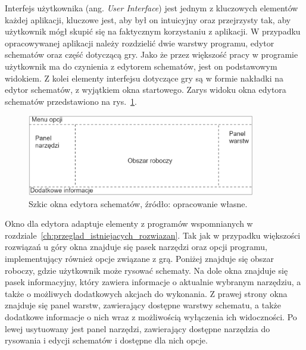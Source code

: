 Interfejs użytkownika (ang. \textit{User Interface}) jest jednym z kluczowych elementów każdej aplikacji,
kluczowe jest, aby był on intuicyjny oraz przejrzysty tak,
aby użytkownik mógł skupić się na faktycznym korzystaniu z aplikacji.
W przypadku opracowywanej aplikacji należy rozdzielić dwie warstwy programu,
edytor schematów oraz część dotyczącą gry.
Jako że przez większość pracy w programie użytkownik ma do czynienia z edytorem schematów,
jest on podstawowym widokiem.
Z kolei elementy interfejsu dotyczące gry są w formie nakładki na edytor schematów, z wyjątkiem okna startowego.
Zarys widoku okna edytora schematów przedstawiono na rys.~\ref{fig:editor}.

\begin{figure}[h]
    \centering
    \includegraphics[width=0.89\textwidth]{chapters/chapter3/rys/ui_projekt}
    \caption[Szkic okna edytora schematów]{Szkic okna edytora schematów, źródło: opracowanie własne.}
    \label{fig:editor}
\end{figure}

\indent Okno dla edytora adaptuje elementy
z programów wspomnianych w rozdziale~\ref{ch:przeglad_istniejacych_rozwiazan}.
Tak jak w przypadku większości rozwiązań u góry okna znajduje się pasek narzędzi oraz opcji programu,
implementujący również opcje związane z grą.
Poniżej znajduje się obszar roboczy, gdzie użytkownik może rysować schematy.
Na dole okna znajduje się pasek informacyjny, który zawiera informacje o aktualnie wybranym narzędziu,
a także o możliwych dodatkowych akcjach do wykonania.
Z prawej strony okna znajduje się panel warstw, zawierający dostępne warstwy schematu,
a także dodatkowe informacje o nich wraz z możliwością wyłączenia ich widoczności.
Po lewej usytuowany jest panel narzędzi, zawierający dostępne narzędzia do rysowania i edycji schematów
i dostępne dla nich opcje.
